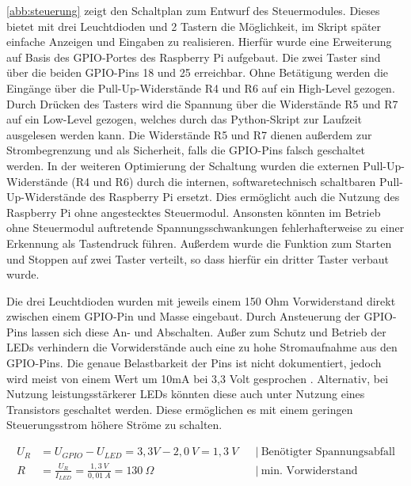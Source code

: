 \documentclass[a4paper,12pt,bibliography=totoc, listof=totoc,titlepage,pointlessnumbers]{scrreprt}
\begin{document}
\autoref{abb:steuerung} zeigt den Schaltplan zum Entwurf des Steuermodules. Dieses bietet mit drei Leuchtdioden und 2 Tastern die Möglichkeit, im Skript später einfache Anzeigen und Eingaben zu realisieren. Hierfür wurde eine Erweiterung auf Basis des GPIO-Portes des Rasp\-berry Pi aufgebaut. Die zwei Taster sind über die beiden GPIO-Pins 18 und 25 erreichbar. Ohne Betätigung werden die Eingänge über die Pull-Up-Widerstände R4 und R6 auf ein High-Level gezogen. Durch Drücken des Tasters wird die Spannung über die Widerstände R5 und R7 auf ein Low-Level gezogen, welches durch das Python-Skript zur Laufzeit ausgelesen werden kann. Die Widerstände R5 und R7 dienen außerdem zur Strombegrenzung und als Sicherheit, falls die GPIO-Pins falsch geschaltet werden.
In der weiteren Optimierung der Schaltung wurden die externen Pull-Up-Widerstände (R4 und R6) durch die internen, softwaretechnisch schaltbaren Pull-Up-Widerstände des Raspberry Pi ersetzt. Dies ermöglicht auch die Nutzung des Raspberry Pi ohne angestecktes Steuermodul. Ansonsten könnten im Betrieb ohne Steuermodul auftretende Spannungsschwankungen fehlerhafterweise zu einer Erkennung als Tastendruck führen. Außerdem wurde die Funktion zum Starten und Stoppen auf zwei Taster verteilt, so dass hierfür ein dritter Taster verbaut wurde.

Die drei Leuchtdioden wurden mit jeweils einem 150 Ohm Vorwiderstand direkt zwischen einem GPIO-Pin und Masse eingebaut. Durch Ansteuerung der GPIO-Pins lassen sich diese An- und Abschalten. Außer zum Schutz und Betrieb der LEDs verhindern die Vorwiderstände auch eine zu hohe Stromaufnahme aus den GPIO-Pins. Die genaue Belastbarkeit der Pins ist nicht dokumentiert, jedoch wird meist von einem Wert um 10mA bei 3,3 Volt gesprochen \citep[zum Beispiel][]{ekRaspPin}. Alternativ, bei Nutzung leistungsstärkerer LEDs könnten diese auch unter Nutzung eines Transistors geschaltet werden. Diese ermöglichen es mit einem geringen Steuerungsstrom höhere Ströme zu schalten.

\begin{equation}
\begin{aligned}
U_R &= U_{GPIO} - U_{LED} = 3,3V - 2,0~V = 1,3~V    && \left|\  \text{Benötigter Spannungsabfall} \right. \\
R &= \frac{U_R}{I_{LED}} = \frac{1,3~V}{0,01~A} = 130~\Omega   && \left|\  \text{min. Vorwiderstand} \right. \\
\end{aligned}
\label{eq:vorwiderstand}
\end{equation}
\end{document}

